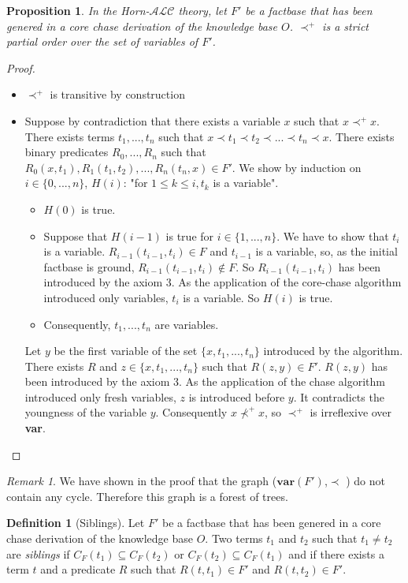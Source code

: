 \documentclass{article}
\newtheorem{proposition}{Proposition}[section]
\theoremstyle{definition}
\newtheorem{definition}{Definition}[section]
\theoremstyle{remark}
\newtheorem{remark}{Remark}[section]
\begin{document}
\begin{proposition}
In the Horn-$\mathcal{ALC}$ theory, let $F'$ be a factbase that has been genered in a core chase derivation of the knowledge base $O$. $\prec^+$ is a strict partial order over the set of variables of $F'$.
\end{proposition}

\begin{proof}
\begin{itemize}
\item $\prec^+$ is transitive by construction
\item Suppose by contradiction that there exists a variable $x$ such that $x \prec^+ x$. There exists terms $t_1,...,t_n$ such that $x \prec t_1 \prec t_2 \prec ... \prec t_n \prec x$. There exists binary predicates $R_0,...,R_n$ such that $R_0(x,t_1),R_1(t_1,t_2),...,R_n(t_n,x) \in F'$. We show by induction on $i\in \{0,...,n\}$, $H(i)$: "for $1 \leq k \leq i,t_k$ is a variable".
\begin{itemize}
\item $H(0)$ is true.
\item Suppose that $H(i-1)$ is true for $i \in \{1,...,n\}$. We have to show that $t_i$ is a variable. $R_{i-1}(t_{i-1},t_i) \in F$ and $t_{i-1}$ is a variable, so, as the initial factbase is ground, $R_{i-1}(t_{i-1},t_i) \notin F$. So $R_{i-1}(t_{i-1},t_i)$ has been introduced by the axiom 3. As the application of the core-chase algorithm introduced only variables, $t_i$ is a variable. So $H(i)$ is true.
\item Consequently, $t_1,...,t_n$ are variables.
\end{itemize}
Let $y$ be the first variable of the set $\{x,t_1,...,t_n\}$  introduced by the algorithm. There exists $R$ and $z \in \{x,t_1,...,t_n\}$ such that $R(z,y) \in F'$. $R(z,y)$ has been introduced by the axiom 3. As the application of the chase algorithm introduced only fresh variables, $z$ is introduced before $y$. It contradicts the youngness of the variable $y$. Consequently $x \nprec^+ x$, so $\prec^+$ is irreflexive over \textbf{var}.
\end{itemize}
\end{proof}

\begin{remark}
We have shown in the proof that the graph ($\textbf{var}(F')$,$\prec$ ) do not contain any cycle. Therefore this graph is a forest of trees.
\end{remark}

\begin{definition}[Siblings]
Let $F'$ be a factbase that has been genered in a core chase derivation of the knowledge base $O$. Two terms $t_1$ and $t_2$ such that $t_1 \neq t_2$ are \emph{siblings} if $C_F(t_1) \subseteq C_F(t_2)$ or $C_F(t_2) \subseteq C_F(t_1)$ and if there exists a term $t$ and a predicate $R$ such that $R(t,t_1) \in F'$ and $R(t,t_2) \in F'$.
\end{definition}
\end{document}
